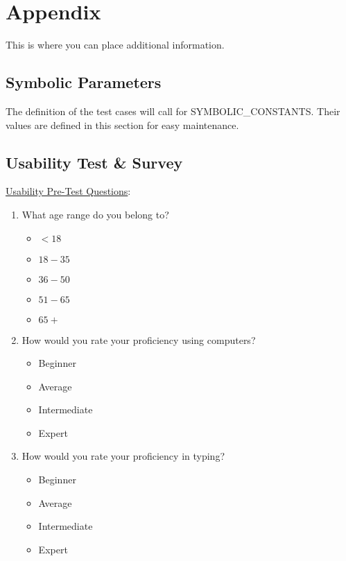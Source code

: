 \documentclass[12pt, titlepage]{article}
\begin{document}




\newpage

\section{Appendix}

This is where you can place additional information.

\subsection{Symbolic Parameters}

The definition of the test cases will call for SYMBOLIC\_CONSTANTS.
Their values are defined in this section for easy maintenance.

\subsection{Usability Test \& Survey}
\label{sec:Appendix}
\underline{Usability Pre-Test Questions}:
\begin{enumerate}
  \item What age range do you belong to?
    \begin{itemize}
      \item $<18$
      \item $18 - 35$
      \item $36 - 50$
      \item $51 - 65$
      \item $65 +$
    \end{itemize}
	\item How would you rate your proficiency using computers?
    \begin{itemize}
      \item Beginner
      \item Average
      \item Intermediate
      \item Expert
    \end{itemize}
  \item How would you rate your proficiency in typing?
    \begin{itemize}
      \item Beginner
      \item Average
      \item Intermediate
      \item Expert
    \end{itemize}
\end{enumerate}
\end{document}
